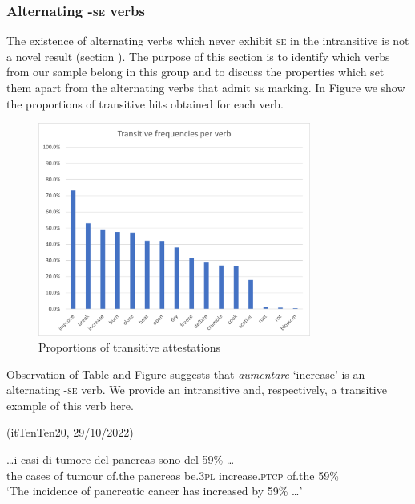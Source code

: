 \documentclass[output=paper,colorlinks,citecolor=brown
]{langscibook}
\begin{document}
\subsubsection{Alternating -\textsc{se} verbs}
\label{bentley_section_3.3.1}
The existence of alternating verbs which never exhibit \textsc{se} in the intransitive is not a novel result (section ). The purpose of this section is to identify which verbs from our sample belong in this group and to discuss the properties which set them apart from the alternating verbs that admit \textsc{se} marking. In Figure  we show the proportions of transitive hits obtained for each verb.

\begin{figure}[hbt!]
\centering
\includegraphics[width=0.8\textwidth]{bentley_figure2.png}
\caption{\label{fig:bentley_figure_2}Proportions of transitive attestations }
\end{figure}    

Observation of Table  and Figure  suggests that \textit{aumentare} ‘increase’ is an alternating   -\textsc{se} verb. We provide an intransitive and, respectively, a transitive example of this verb here.

\hspace*{\fill}(itTenTen20, 29/10/2022)\quad

\ea \label{bentley_example_8}
    \gll  \ldots  i casi di tumore del pancreas sono  del 59\%  \ldots  \\
    the cases of tumour of.the pancreas be.3\textsc{pl} increase.\textsc{ptcp} of.the 59\% \\
    \glt ‘The incidence of pancreatic cancer has increased by 59\% \ldots ’
\z
\end{document}
